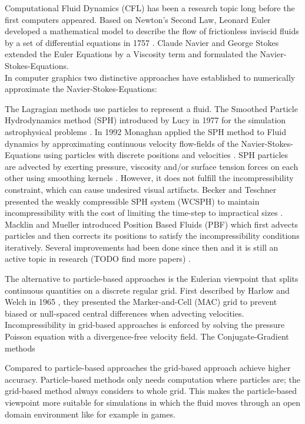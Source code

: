 Computational Fluid Dynamics (CFL) has been a research topic long before the first computers appeared. Based on Newton's Second Law, Leonard Euler developed a mathematical model to describe the flow of frictionless inviscid fluids by a set of differential equations in 1757 \parencite{euler1757principes}. Claude Navier and George Stokes extended the Euler Equations by a Viscosity term and formulated the Navier-Stokes-Equations. \\
In computer graphics two distinctive approaches have established to numerically approximate the Navier-Stokes-Equations: 
\par The Lagragian methods use particles to represent a fluid. The Smoothed Particle Hydrodynamics method (SPH) introduced by Lucy in 1977 for the simulation astrophysical problems \parencite{lucy1977numerical}. In 1992 Monaghan applied the SPH method to Fluid dynamics by approximating continuous velocity flow-fields of the Navier-Stokes-Equations using particles with discrete positions and velocities \parencite{monaghan1992smoothed}. SPH particles are advected by exerting pressure, viscosity and/or surface tension forces on each other using smoothing kernels \parencite{muller2003particle}. However, it does not fulfill the incompressibility constraint, which can cause undesired visual artifacts. Becker and Teschner presented the weakly compressible SPH system (WCSPH) to maintain incompressibility with the cost of limiting the time-step to impractical sizes \parencite{becker2007weakly}. Macklin and Mueller \parencite{macklin2013position} introduced Position Based Fluids (PBF) which first advects particles and then corrects its positions to satisfy the incompressibility conditions iteratively. Several improvements had been done since then and it is still an active topic in research (TODO find more papers) \parencite{morikawaimprovements}.
\par The alternative to particle-based approaches is the Eulerian viewpoint that splits continuous quantities on a discrete regular grid. First described by Harlow and Welch in 1965 \parencite{harlow1965numerical}, they presented the Marker-and-Cell (MAC) grid to prevent biased or null-spaced central differences when advecting velocities. Incompressibility in grid-based approaches is enforced by solving the pressure Poisson equation with a divergence-free velocity field. The Conjugate-Gradient methods 
\par Compared to particle-based approaches the grid-based approach achieve higher accuracy. Particle-based methods only needs computation where particles are; the grid-based method always considers to whole grid. This makes the particle-based viewpoint more suitable for simulations in which the fluid moves through an open domain environment like for example in games. 
